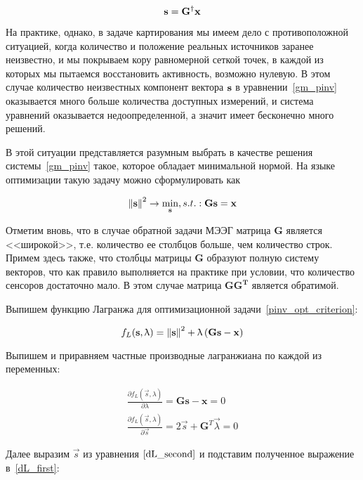 \begin{equation*}
    \mathbf{s} = \mathbf{G}^\dagger\mathbf{x}
\end{equation*}

На практике, однако, в задаче картирования мы имеем дело с противоположной ситуацией,
когда количество и положение реальных источников заранее неизвестно, и мы
покрываем кору равномерной сеткой точек, в каждой из которых мы пытаемся восстановить активность,
возможно нулевую. В этом случае количество неизвестных компонент вектора $\mathbf{s}$ в уравнении~\ref{gm_pinv}
оказывается много больше количества доступных измерений,
и система уравнений оказывается недоопределенной, а значит имеет бесконечно много решений.

В этой ситуации представляется разумным выбрать в качестве решения системы~\ref{gm_pinv}
такое, которое обладает минимальной нормой.
На языке оптимизации такую задачу можно сформулировать как

\begin{equation}
    \left\lVert\mathbf{s}\right\rVert^2 \rightarrow \underset{\mathbf{s}}{\min},
    s.t.: \mathbf{G} \mathbf{s} = \mathbf{x}
    \label{pinv_opt_criterion}
\end{equation}

Отметим вновь, что в случае обратной задачи МЭЭГ матрица $\mathbf{G}$ является
<<широкой>>, т.е.  количество ее столбцов больше, чем количество строк. Примем
здесь также, что столбцы матрицы $\mathbf{G}$ образуют полную систему векторов,
что как правило выполняется на практике при условии, что количество сенсоров
достаточно мало. В этом случае матрица $\mathbf{GG^T}$ является обратимой.

Выпишем функцию Лагранжа для оптимизационной задачи~\ref{pinv_opt_criterion}:

\begin{equation}
    f_L(\mathbf{s}, \uplambda) = \left\lVert\mathbf{s}\right\rVert^2 + \uplambda \left(\mathbf{Gs - x}\right)
\end{equation}

Выпишем и приравняем частные производные лагранжиана по каждой из переменных:

\begin{gather}
    \frac{\partial f_L(\vec{s}, \lambda)}{\partial \lambda} = \mathbf{Gs - x} = 0
    \label{dL_first} \\
    \frac{\partial f_L(\vec{s}, \lambda)}{\partial \vec{s}} = 2\vec{s}
    + \mathbf{G}^T\vec{\lambda} = 0
    \label{dL_second}
\end{gather}

Далее выразим $\vec{s}$ из уравнения $\ref{dL_second}$ и подставим
полученное выражение в~\ref{dL_first}:

